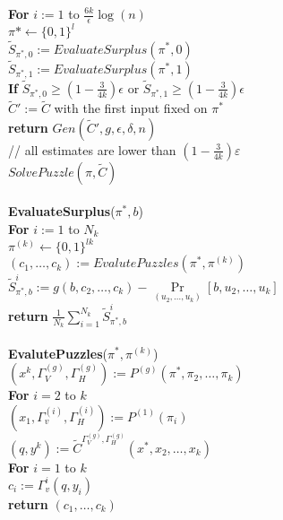 \begin{codeblock}
  \textbf{For} $i:=1$ to $\frac{6k}{\epsilon}\log(n)$ \\
  \IndI $\pi* \leftarrow \{0,1\}^{l}$\\
  \IndI $\widetilde{S}_{\pi^*,0} := EvaluateSurplus(\pi^*, 0)$\\
  \IndI $\widetilde{S}_{\pi^*,1} := EvaluateSurplus(\pi^*, 1)$\\
  \IndI \textbf{If} $\widetilde{S}_{\pi^*,0} \geq (1 - \frac{3}{4k}) \epsilon$ or $\widetilde{S}_{\pi^*,1} \geq (1 - \frac{3}{4k}) \epsilon$ \\
  \IndII $\widetilde{C}' := \widetilde{C}$ with the first input fixed on $\pi^*$\\
  \IndII\textbf{return} $Gen(\widetilde{C}', g, \epsilon, \delta, n)$ \\
  // all estimates are lower than $(1-\frac{3}{4k})\varepsilon$\\
  $SolvePuzzle(\pi, \widetilde{C})$ \\
  \\
  \textbf{EvaluateSurplus}($\pi^*, b$) \\
  \IndI \textbf{For} $i:=1$ to $N_k$ \\
  \IndII $\pi^{(k)} \leftarrow \{0,1\}^{lk}$\\
  \IndII $(c_1, \dots, c_k) := EvalutePuzzles(\pi^*, \pi^{(k)})$\\
  \IndII $\widetilde{S}_{\pi^*,b}^i := g(b, c_2, \dots, c_k) - \underset{(u_2, \dots, u_k)}{\Pr}[b, u_2, \dots, u_k] $\\
  \IndI \textbf{return} $\frac{1}{N_k} \sum_{i=1}^{N_k} \widetilde{S}_{\pi^*,b}^i$\\
  \\
  \textbf{EvalutePuzzles}($\pi^*, \pi^{(k)}$)\\
  \IndI $(x^{k}, \Gamma_V^{(g)}, \Gamma_H^{(g)}) := P^{(g)}(\pi^*, \pi_2, \dots, \pi_k)$ \\
  \IndI \textbf{For} $i=2$ to $k$\\
  \IndII $(x_1, \Gamma_v^{(i)}, \Gamma_H^{(i)}) := P^{(1)}(\pi_i)$\\
  \IndI $(q,y^{k}) := \widetilde{C}^{\Gamma_V^{(g)}, \Gamma_H^{(g)}}(x^*, x_2, \dots, x_k)$\\
  \IndI \textbf{For} $i=1$ to $k$\\
  \IndII $c_i := \Gamma_v^{i}(q, y_i)$\\
  \IndI \textbf{return} $(c_1, \dots, c_k)$\\
\end{codeblock}

